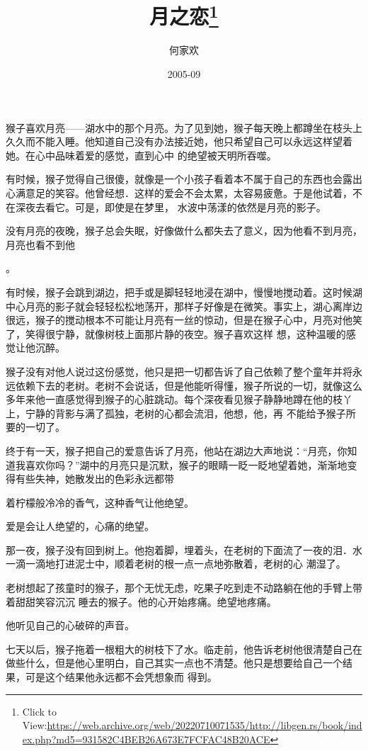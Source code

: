 \documentclass{article}
\title{月之恋\footnote{Click to View:\url{https://web.archive.org/web/20220710071535/http://libgen.rs/book/index.php?md5=931582C4BEB26A673E7FCFAC48B20ACE}}}
\author{何家欢}
\date{2005-09}
\begin{document}

\maketitle


\Large

﻿猴子喜欢月亮——湖水中的那个月亮。为了见到她，猴子每天晚上都蹲坐在枝头上久久而不能入睡。他知道自己没有办法接近她，他只希望自己可以永远这样望着她。在心中品味着爱的感觉，直到心中
的绝望被天明所吞噬。 

有时候，猴子觉得自己很傻，就像是一个小孩子看着本不属于自己的东西也会露出心满意足的笑容。他曾经想．这样的爱会不会太累，太容易疲惫。于是他试着，不在深夜去看它。可是，即使是在梦里，
水波中荡漾的依然是月亮的影子。 

没有月亮的夜晚，猴子总会失眠，好像做什么都失去了意义，因为他看不到月亮，月亮也看不到他

\newpage
。 

有时候，猴子会跳到湖边，把手或是脚轻轻地浸在湖中，慢慢地搅动着。这时候湖中心月亮的影子就会轻轻松松地荡开，那样子好像是在微笑。事实上，湖心离岸边很远，猴子的搅动根本不可能让月亮有一丝的惊动，但是在猴子心中，月亮对他笑了，笑得很宁静，就像树枝上面那片静的夜空。猴子喜欢这样
想，这种温暖的感觉让他沉醉。 

猴子没有对他人说过这份感觉，他只是把一切都告诉了自己依赖了整个童年并将永远依赖下去的老树。老树不会说话，但是他能听得懂，猴子所说的一切，就像这么多年来他一直感觉得到猴子的心脏跳动。每个深夜看见猴子静静地蹲在他的枝丫上，宁静的背影与满了孤独，老树的心都会流泪，他想，他，再
不能给予猴子所要的一切了。 

终于有一天，猴子把自己的爱意告诉了月亮，他站在湖边大声地说：“月亮，你知道我喜欢你吗？”湖中的月亮只是沉默，猴子的眼睛一眨一眨地望着她，渐渐地变得有些失神，她散发出的色彩永远都带
\newpage

着柠檬般冷冷的香气，这种香气让他绝望。 


爱是会让人绝望的，心痛的绝望。 

那一夜，猴子没有回到树上。他抱着脚，埋着头，在老树的下面流了一夜的泪．水一滴一滴地打进泥士中，顺着老树的根一点一点地弥散着，老树的心
潮湿了。 

老树想起了孩童时的猴子，那个无忧无虑，吃果子吃到走不动路躺在他的手臂上带着甜甜笑容沉沉
睡去的猴子。他的心开始疼痛。绝望地疼痛。 


他听见自己的心破碎的声音。 

七天以后，猴子拖着一根粗大的树枝下了水。临走前，他告诉老树他很清楚自己在做些什么，但是他心里明白，自己其实一点也不清楚。他只是想要给自己一个结果，可是这个结果他永远都不会凭想象而
得到。 
\end{document}
